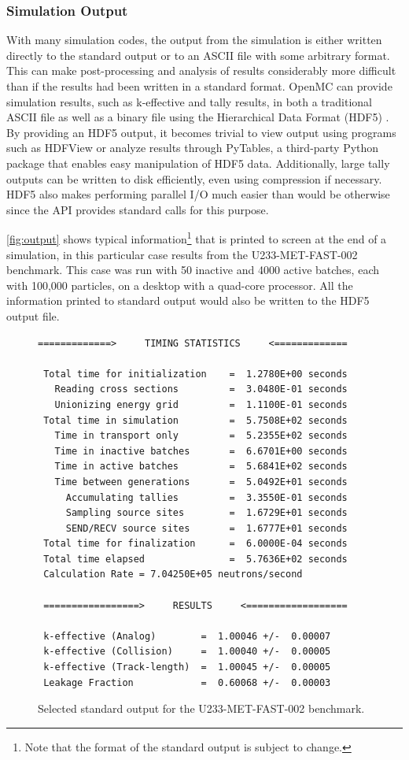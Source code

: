 \documentclass[authoryear,preprint]{elsarticle}
\begin{document}
\subsubsection{Simulation Output}

With many simulation codes, the output from the simulation is either written
directly to the standard output or to an ASCII file with some arbitrary
format. This can make post-processing and analysis of results considerably more
difficult than if the results had been written in a standard format. OpenMC can
provide simulation results, such as k-effective and tally results, in both a
traditional ASCII file as well as a binary file using the Hierarchical Data
Format (HDF5) \citep{hdf5}. By providing an HDF5 output, it becomes trivial to
view output using programs such as HDFView or analyze results through PyTables,
a third-party Python package that enables easy manipulation of HDF5
data. Additionally, large tally outputs can be written to disk efficiently, even
using compression if necessary. HDF5 also makes performing parallel I/O much
easier than would be otherwise since the API provides standard calls for this
purpose.

\autoref{fig:output} shows typical information\footnote{Note that the format of
  the standard output is subject to change.} that is printed to screen at the
end of a simulation, in this particular case results from the U233-MET-FAST-002
benchmark. This case was run with 50 inactive and 4000 active batches, each with
100,000 particles, on a desktop with a quad-core processor. All the information
printed to standard output would also be written to the HDF5 output file.

\begin{figure}
  \small{
    \begin{verbatim}
=============>     TIMING STATISTICS     <=============

 Total time for initialization    =  1.2780E+00 seconds
   Reading cross sections         =  3.0480E-01 seconds
   Unionizing energy grid         =  1.1100E-01 seconds
 Total time in simulation         =  5.7508E+02 seconds
   Time in transport only         =  5.2355E+02 seconds
   Time in inactive batches       =  6.6701E+00 seconds
   Time in active batches         =  5.6841E+02 seconds
   Time between generations       =  5.0492E+01 seconds
     Accumulating tallies         =  3.3550E-01 seconds
     Sampling source sites        =  1.6729E+01 seconds
     SEND/RECV source sites       =  1.6777E+01 seconds
 Total time for finalization      =  6.0000E-04 seconds
 Total time elapsed               =  5.7636E+02 seconds
 Calculation Rate = 7.04250E+05 neutrons/second

 =================>     RESULTS     <==================

 k-effective (Analog)        =  1.00046 +/-  0.00007
 k-effective (Collision)     =  1.00040 +/-  0.00005
 k-effective (Track-length)  =  1.00045 +/-  0.00005
 Leakage Fraction            =  0.60068 +/-  0.00003
    \end{verbatim}
  }
  \caption{Selected standard output for the U233-MET-FAST-002 benchmark.}
  \label{fig:output}
\end{figure}
\end{document}
